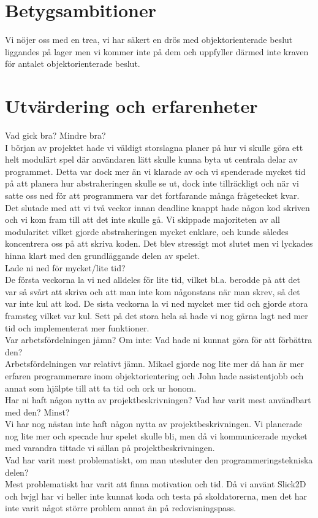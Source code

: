 \section{Betygsambitioner}
Vi nöjer oss med en trea, vi har säkert en drös med objektorienterade beslut liggandes på lager men vi kommer inte på dem och uppfyller därmed inte kraven för antalet objektorienterade beslut.
\section{Utvärdering och erfarenheter}
{\color{red}
Vad gick bra? Mindre bra?\\}
I början av projektet hade vi väldigt storslagna planer på hur vi skulle göra ett helt modulärt spel där användaren lätt skulle kunna byta ut centrala delar av programmet. Detta var dock mer än vi klarade av och vi spenderade mycket tid på att planera hur abstraheringen skulle se ut, dock inte tillräckligt och när vi satte oss ned för att programmera var det fortfarande många frågetecket kvar. Det slutade med att vi två veckor innan deadline knappt hade någon kod skriven och vi kom fram till att det inte skulle gå. Vi skippade majoriteten av all modularitet vilket gjorde abstraheringen mycket enklare, och kunde således koncentrera oss på att skriva koden. Det blev stressigt mot slutet men vi lyckades hinna klart med den grundläggande delen av spelet. \\

{\color{red}Lade ni ned för mycket/lite tid?\\}
De första veckorna la vi ned alldeles för lite tid, vilket bl.a. berodde på att det var så svårt att skriva och att man inte kom någonstans när man skrev, så det var inte kul att kod. De sista veckorna la vi ned mycket mer tid och gjorde stora framsteg vilket var kul. Sett på det stora hela så hade vi nog gärna lagt ned mer tid och implementerat mer funktioner.\\

{\color{red}Var arbetsfördelningen jämn? Om inte: Vad hade ni kunnat göra för att förbättra den?\\}
Arbetsfördelningen var relativt jämn. Mikael gjorde nog lite mer då han är mer erfaren programmerare inom objektorientering och John hade assistentjobb och annat som hjälpte till att ta tid och ork ur honom.\\

{\color{red}Har ni haft någon nytta av projektbeskrivningen? Vad har varit mest användbart med den? Minst?\\}
Vi har nog nästan inte haft någon nytta av projektbeskrivningen. Vi planerade nog lite mer och specade hur spelet skulle bli, men då vi kommunicerade mycket med varandra tittade vi sällan på projektbeskrivningen. \\

{\color{red}Vad har varit mest problematiskt, om man utesluter den programmeringstekniska delen?\\}
Mest problematiskt har varit att finna motivation och tid. Då vi använt Slick2D och lwjgl har vi heller inte kunnat koda och testa på skoldatorerna, men det har inte varit något större problem annat än på redovisningspass.\\
